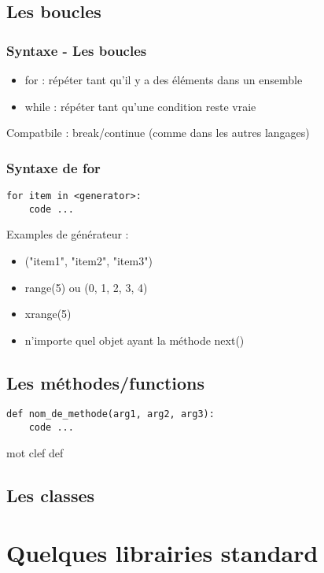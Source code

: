 \subsection{Les boucles}
\begin{frame}[fragile]
  \frametitle{Syntaxe - Les boucles}
  \begin{itemize}
  \item for : répéter tant qu'il y a des éléments dans un ensemble
  \item while : répéter tant qu'une condition reste vraie
  \end{itemize}

Compatbile : break/continue (comme dans les autres langages)
\end{frame}

\begin{frame}[fragile]
  \frametitle{Syntaxe de for}
  \begin{lstlisting}
for item in <generator>:
    code ...
  \end{lstlisting}
Examples de générateur :
  \begin{itemize}
  \item ("item1", "item2", "item3")
  \item range(5) ou (0, 1, 2, 3, 4)
  \item xrange(5)
  \item n'importe quel objet ayant la méthode next()
  \end{itemize}
\end{frame}

\subsection{Les méthodes/functions}
\begin{frame}[fragile]
  \begin{lstlisting}
def nom_de_methode(arg1, arg2, arg3):
    code ...
  \end{lstlisting}
  \begin{semiverbatim}
mot clef def
  \end{semiverbatim}
\end{frame}

\subsection{Les classes}
\begin{frame}[fragile]
\end{frame}

\section{Quelques librairies standard}
\begin{frame}[fragile]
\end{frame}
